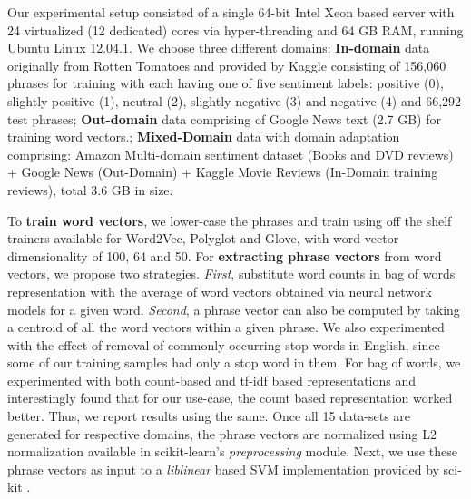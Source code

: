 Our experimental setup consisted of a single 64-bit Intel Xeon based server with 24 virtualized (12 dedicated) cores via hyper-threading and 64 GB RAM, running Ubuntu Linux 12.04.1. We choose three different domains: \textbf{In-domain} data originally from Rotten Tomatoes and provided by Kaggle\footnotemark {} consisting of 156,060 phrases for training with each having one of five sentiment labels: positive (0), slightly positive (1), neutral (2), slightly negative (3) and negative (4) and 66,292 test phrases; \textbf{Out-domain} data comprising of Google News text\footnotemark {} (2.7 GB) for training word vectors.; \textbf{Mixed-Domain} data with domain adaptation comprising: Amazon Multi-domain sentiment dataset\footnotemark {} \parencite{BlitzerPaper:2007} (Books and DVD reviews) + Google News (Out-Domain) + Kaggle Movie Reviews (In-Domain training reviews), total 3.6 GB in size. 
\newline

To \textbf{train word vectors}, we lower-case the phrases and train using off the shelf trainers available for Word2Vec, Polyglot and Glove, with word vector dimensionality of 100, 64 and 50.  For \textbf{extracting phrase vectors} from word vectors, we propose two strategies. \textit{First}, substitute word counts in bag of words representation with the average of word vectors obtained via neural network models for a  given word. \textit{Second}, a phrase vector can also be computed by taking a centroid of all the word vectors within a given phrase. We also experimented with the effect of removal of commonly occurring stop words in English, since some of our training samples had only a stop word in them. For bag of words, we experimented with both count-based and tf-idf based representations and interestingly found that for our use-case, the count based representation worked better. Thus, we report results using the same. Once all 15 data-sets are generated for respective domains, the phrase vectors are normalized using L2 normalization available in scikit-learn's \textit{preprocessing} module. Next, we use these phrase vectors as input to a \textit{liblinear} \parencite{LibLinear:2008} based SVM implementation provided by sci-kit \parencite{Scikit:2011}.
\newline


